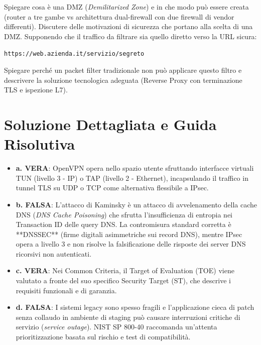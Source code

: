 \documentclass[11pt,a4paper]{article}
\begin{document}
\begin{questionbox}
Spiegare cosa \`e una DMZ (\textit{Demilitarized Zone}) e in che modo pu\`o essere creata (router a tre gambe vs architettura dual-firewall con due firewall di vendor differenti).
Discutere delle motivazioni di sicurezza che portano alla scelta di una DMZ.
Supponendo che il traffico da filtrare sia quello diretto verso la URL sicura:
\begin{center}
\texttt{https://web.azienda.it/servizio/segreto}
\end{center}
Spiegare perch\'e un packet filter tradizionale non pu\`o applicare questo filtro e descrivere la soluzione tecnologica adeguata (Reverse Proxy con terminazione TLS e ispezione L7).
\end{questionbox}

\newpage
\section{Soluzione Dettagliata e Guida Risolutiva}

\begin{solutionbox}
\begin{itemize}
    \item \textbf{a. VERA}: OpenVPN opera nello spazio utente sfruttando interfacce virtuali TUN (livello 3 - IP) o TAP (livello 2 - Ethernet), incapsulando il traffico in tunnel TLS su UDP o TCP come alternativa flessibile a IPsec.
    \item \textbf{b. FALSA}: L'attacco di Kaminsky \`e un attacco di avvelenamento della cache DNS (\textit{DNS Cache Poisoning}) che sfrutta l'insufficienza di entropia nei Transaction ID delle query DNS. La contromisura standard corretta \`e **DNSSEC** (firme digitali asimmetriche sui record DNS), mentre IPsec opera a livello 3 e non risolve la falsificazione delle risposte dei server DNS ricorsivi non autenticati.
    \item \textbf{c. VERA}: Nei Common Criteria, il Target of Evaluation (TOE) viene valutato a fronte del suo specifico Security Target (ST), che descrive i requisiti funzionali e di garanzia.
    \item \textbf{d. FALSA}: I sistemi legacy sono spesso fragili e l'applicazione cieca di patch senza collaudo in ambiente di staging pu\`o causare interruzioni critiche di servizio (\textit{service outage}). NIST SP 800-40 raccomanda un'attenta prioritizzazione basata sul rischio e test di compatibilit\`a.
\end{itemize}
\end{solutionbox}
\end{document}
